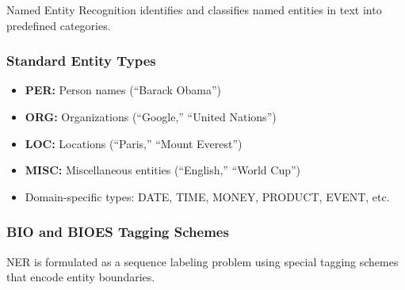 Named Entity Recognition identifies and classifies named entities in text into predefined
categories.

\subsubsection{Standard Entity Types}

\begin{itemize}
    \item \textbf{PER:} Person names (``Barack Obama'')
    \item \textbf{ORG:} Organizations (``Google,'' ``United Nations'')
    \item \textbf{LOC:} Locations (``Paris,'' ``Mount Everest'')
    \item \textbf{MISC:} Miscellaneous entities (``English,'' ``World Cup'')
    \item Domain-specific types: DATE, TIME, MONEY, PRODUCT, EVENT, etc.
\end{itemize}

\subsubsection{BIO and BIOES Tagging Schemes}

NER is formulated as a sequence labeling problem using special tagging schemes that
encode entity boundaries.

